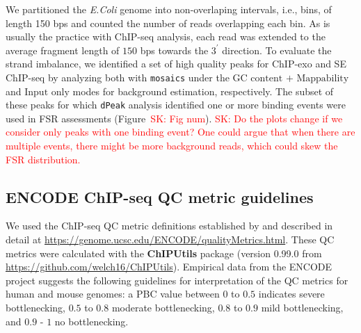 \documentclass{bmcart}
\newcommand{\SK}[1]{\textcolor{red}{SK: #1}}
\newcommand{\sig}{\sigma^{70}}
\begin{document}

We partitioned the \emph{E.Coli} genome into
non-overlaping intervals, i.e., bins, of length 150 bps and counted the number of reads overlapping each bin. As is usually the practice with ChIP-seq analysis, each read was extended to the average fragment length of $150$ bps towards the $3^{\prime}$ direction.
To evaluate the strand imbalance, we identified a set of high quality peaks
for ChIP-exo and SE ChIP-seq by analyzing both with \texttt{mosaics} \cite{mosaics}
under the  $\mbox{GC content + Mappability}$ and $\mbox{Input only}$ modes for background estimation, respectively.
The subset of these peaks for which \texttt{dPeak} analysis  identified one or more binding events were used in FSR assessments (Figure~\SK{Fig num}).  \SK{Do the plots change if we consider only peaks with one binding event? One could argue that when there are multiple events, there might be more background reads, which could skew the FSR distribution.}




\subsection*{ENCODE  ChIP-seq QC metric guidelines}


We used the ChIP-seq QC metric definitions  established by \cite{encode_qc} and described in detail at
\url{https://genome.ucsc.edu/ENCODE/qualityMetrics.html}.
These QC metrics were calculated with the \textbf{ChIPUtils}
package (version 0.99.0 from 
\url{https://github.com/welch16/ChIPUtils}). 
Empirical data from the ENCODE project suggests the following guidelines for interpretation of the QC metrics for human and mouse genomes: a PBC value
between $0$ to $0.5$  indicates severe bottlenecking,  $0.5$ to $0.8$
moderate bottlenecking,  $0.8$ to $0.9$  mild
bottlenecking, and  $0.9$ - $1$ no bottlenecking.
\end{document}
